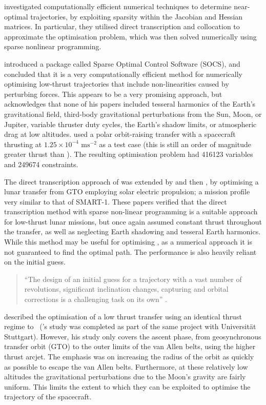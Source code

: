 \textcite{Betts1993} investigated computationally efficient numerical techniques to determine near-optimal trajectories, by exploiting sparsity within the Jacobian and Hessian matrices. In particular, they utilised direct transcription and collocation to approximate the optimisation problem, which was then solved numerically using sparse nonlinear programming.
 
\textcite{Betts1994} introduced a package called Sparse Optimal Control Software (SOCS), and concluded that it is a very computationally efficient method for numerically optimising low-thrust trajectories that include non-linearities caused by perturbing forces. This appears to be a very promising approach, but \textcite{Betts2000} acknowledges that none of his papers included tesseral harmonics of the Earth's gravitational field, third-body gravitational perturbations from the Sun, Moon, or Jupiter, variable thruster duty cycles, the Earth's shadow limits, or atmospheric drag at low altitudes. \textcite{Betts2000} used a polar orbit-raising transfer with a spacecraft thrusting at $1.25\times10^{-4}\text{ ms}^{-2}$ as a test case (this is still an order of magnitude greater thrust than \BW). The resulting optimisation problem had 416123 variables and 249674 constraints.

The direct transcription approach of \textcite{Betts1993} was extended by \textcite{Erb_thesis} and then \textcite{Betts2003}, by optimising a lunar transfer from GTO employing solar electric propulsion; a mission profile very similar to that of SMART-1. These papers verified that the direct transcription method with sparse non-linear programming is a suitable approach for low-thrust lunar missions, but once again assumed constant thrust throughout the transfer, as well as neglecting Earth shadowing and tesseral Earth harmonics. While this method may be useful for optimising \BW, as a numerical approach it is not guaranteed to find the optimal path. The performance is also heavily reliant on the initial guess.

\begin{quotation}\enquote{The design of an initial guess for a trajectory with a vast number of revolutions, significant inclination changes, capturing and orbital corrections is a challenging task on its own} \parencite[p. 144]{Betts2003}.
\end{quotation}

\textcite{Letterio_thesis} described the optimisation of a low thrust transfer using an identical thrust regime to \BW\ (\citeauthor{Letterio_thesis}'s study was completed as part of the same project with Universit\"{a}t Stuttgart). However, his study only covers the ascent phase, from geosynchronous transfer orbit (GTO) to the outer limits of the van Allen belts, using the higher thrust arcjet. The emphasis was on increasing the radius of the orbit as quickly as possible to escape the van Allen belts. Furthermore, at these relatively low altitudes the gravitational perturbations due to the Moon's gravity are fairly uniform. This limits the extent to which they can be exploited to optimise the trajectory of the spacecraft.

